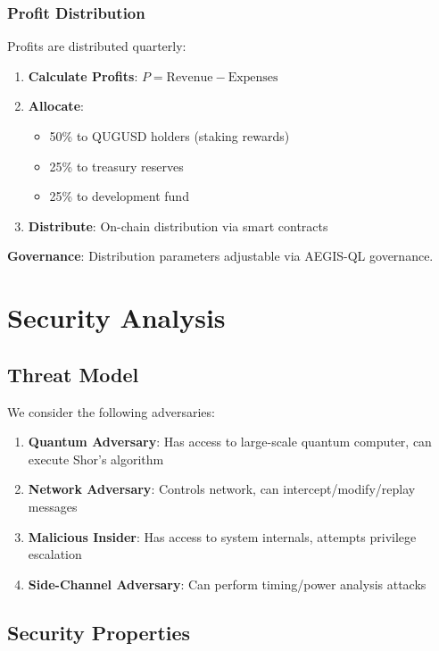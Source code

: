 \documentclass[11pt,a4paper]{article}
\begin{document}
\subsubsection{Profit Distribution}

Profits are distributed quarterly:

\begin{enumerate}[leftmargin=*]
    \item \textbf{Calculate Profits}: $P = \text{Revenue} - \text{Expenses}$
    \item \textbf{Allocate}:
    \begin{itemize}
        \item 50\% to QUGUSD holders (staking rewards)
        \item 25\% to treasury reserves
        \item 25\% to development fund
    \end{itemize}
    \item \textbf{Distribute}: On-chain distribution via smart contracts
\end{enumerate}

\textbf{Governance}: Distribution parameters adjustable via AEGIS-QL governance.

\section{Security Analysis}

\subsection{Threat Model}

We consider the following adversaries:

\begin{enumerate}[leftmargin=*]
    \item \textbf{Quantum Adversary}: Has access to large-scale quantum computer, can execute Shor's algorithm
    \item \textbf{Network Adversary}: Controls network, can intercept/modify/replay messages
    \item \textbf{Malicious Insider}: Has access to system internals, attempts privilege escalation
    \item \textbf{Side-Channel Adversary}: Can perform timing/power analysis attacks
\end{enumerate}

\subsection{Security Properties}
\end{document}
